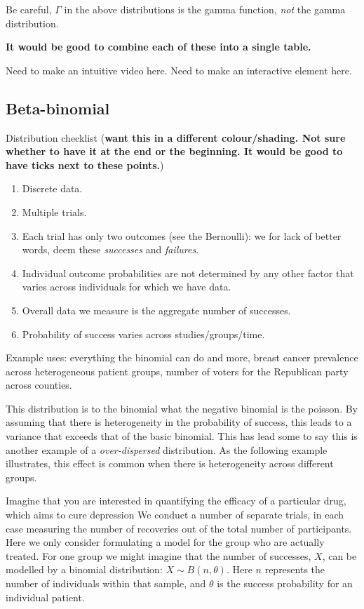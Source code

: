 \documentclass[11pt,fullpage]{book}
\begin{document}
Be careful, $\Gamma$ in the above distributions is the gamma function, \textit{not} the gamma distribution.

\textbf{It would be good to combine each of these into a single table.}

 Need to make an intuitive video here.
 Need to make an interactive element here.

\subsection{Beta-binomial}
Distribution checklist (\textbf{want this in a different colour/shading. Not sure whether to have it at the end or the beginning. It would be good to have ticks next to these points.})

\begin{enumerate} 
\item Discrete data.
\item Multiple trials.
\item Each trial has only two outcomes (see the Bernoulli): we for lack of better words, deem these \textit{successes} and \textit{failures}.
\item Individual outcome probabilities are not determined by any other factor that varies across individuals for which we have data.
\item Overall data we measure is the aggregate number of successes. 
\item Probability of success varies across studies/groups/time.
\end{enumerate}

Example uses: everything the binomial can do and more, breast cancer prevalence across heterogeneous patient groups, number of voters for the Republican party across counties.

This distribution is to the binomial what the negative binomial is the poisson. By assuming that there is heterogeneity in the probability of success, this leads to a variance that exceeds that of the basic binomial. This has lead some to say this is another example of a \textit{over-dispersed} distribution. As the following example illustrates, this effect is common when there is heterogeneity across different groups. 

Imagine that you are interested in quantifying the efficacy of a particular drug, which aims to cure depression We conduct a number of separate trials, in each case measuring the number of recoveries out of the total number of participants. Here we only consider formulating a model for the group who are actually treated. For one group we might imagine that the number of successes, $X$, can be modelled by a binomial distribution: $X\sim B(n,\theta)$. Here $n$ represents the number of individuals within that sample, and $\theta$ is the success probability for an individual patient.
\end{document}
